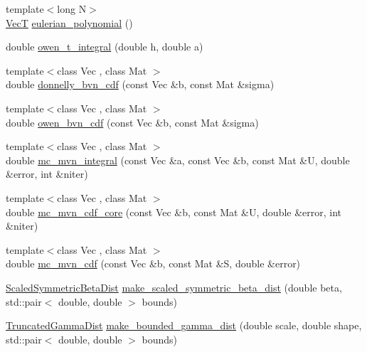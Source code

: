 \begin{DoxyCompactItemize}
\item 
{\footnotesize template$<$long N$>$ }\\\hyperlink{namespaceprior__hessian_a0b42fc70dec525d83fb2ac155d9ab974}{VecT} \hyperlink{namespaceprior__hessian_a05bb4a53732758396a2dc1125da71df5}{eulerian\+\_\+polynomial} ()
\item 
double \hyperlink{namespaceprior__hessian_a12c3a5763e9fbc82e2fb39b8c0273cda}{owen\+\_\+t\+\_\+integral} (double h, double a)
\item 
{\footnotesize template$<$class Vec , class Mat $>$ }\\double \hyperlink{namespaceprior__hessian_a0f8b4ec070533193c3f402bbcc2b8b2b}{donnelly\+\_\+bvn\+\_\+cdf} (const Vec \&b, const Mat \&sigma)
\item 
{\footnotesize template$<$class Vec , class Mat $>$ }\\double \hyperlink{namespaceprior__hessian_a5f7ff26e783adec5fd8ba5e290a7c892}{owen\+\_\+bvn\+\_\+cdf} (const Vec \&b, const Mat \&sigma)
\item 
{\footnotesize template$<$class Vec , class Mat $>$ }\\double \hyperlink{namespaceprior__hessian_abadcc969aeb37b0c2f1e69c75731ec65}{mc\+\_\+mvn\+\_\+integral} (const Vec \&a, const Vec \&b, const Mat \&U, double \&error, int \&niter)
\item 
{\footnotesize template$<$class Vec , class Mat $>$ }\\double \hyperlink{namespaceprior__hessian_af30ccf313fd6eced8ae174f6a0d8457b}{mc\+\_\+mvn\+\_\+cdf\+\_\+core} (const Vec \&b, const Mat \&U, double \&error, int \&niter)
\item 
{\footnotesize template$<$class Vec , class Mat $>$ }\\double \hyperlink{namespaceprior__hessian_a923402e085c726e416b02817a6d47337}{mc\+\_\+mvn\+\_\+cdf} (const Vec \&b, const Mat \&S, double \&error)
\item 
\hyperlink{namespaceprior__hessian_ae84776b8f8ed86c14a5ce47a29b7a1be}{Scaled\+Symmetric\+Beta\+Dist} \hyperlink{namespaceprior__hessian_a2dd8c3c31f349117f96fdddc94d54dd8}{make\+\_\+scaled\+\_\+symmetric\+\_\+beta\+\_\+dist} (double beta, std\+::pair$<$ double, double $>$ bounds)
\item 
\hyperlink{namespaceprior__hessian_acd158ecf6698fbe5a4430df7730d3aba}{Truncated\+Gamma\+Dist} \hyperlink{namespaceprior__hessian_abd1783a43cab6f6855e54eb1faab39d4}{make\+\_\+bounded\+\_\+gamma\+\_\+dist} (double scale, double shape, std\+::pair$<$ double, double $>$ bounds)

\end{DoxyCompactItemize}

